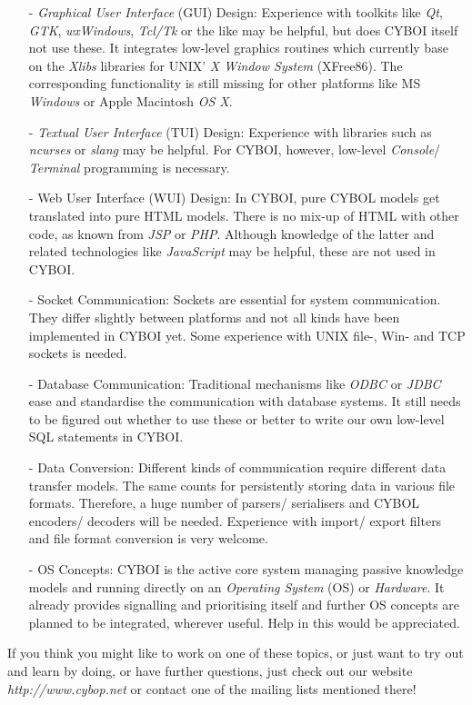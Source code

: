 \begin{itemize}
    \item[-] \emph{Graphical User Interface} (GUI) Design: Experience with
        toolkits like \emph{Qt}, \emph{GTK}, \emph{wxWindows}, \emph{Tcl/Tk} or
        the like may be helpful, but does CYBOI itself not use these. It
        integrates low-level graphics routines which currently base on the
        \emph{Xlibs} libraries for UNIX' \emph{X Window System} (XFree86). The
        corresponding functionality is still missing for other platforms like
        MS \emph{Windows} or Apple Macintosh \emph{OS X}.
    \item[-] \emph{Textual User Interface} (TUI) Design: Experience with
        libraries such as \emph{ncurses} or \emph{slang} may be helpful. For
        CYBOI, however, low-level \emph{Console}/ \emph{Terminal} programming
        is necessary.
    \item[-] Web User Interface (WUI) Design: In CYBOI, pure CYBOL models get
        translated into pure HTML models. There is no mix-up of HTML with other
        code, as known from \emph{JSP} or \emph{PHP}. Although knowledge of the
        latter and related technologies like \emph{JavaScript} may be helpful,
        these are not used in CYBOI.
    \item[-] Socket Communication: Sockets are essential for system
        communication. They differ slightly between platforms and not all kinds
        have been implemented in CYBOI yet. Some experience with UNIX file-,
        Win- and TCP sockets is needed.
    \item[-] Database Communication: Traditional mechanisms like \emph{ODBC} or
        \emph{JDBC} ease and standardise the communication with database
        systems. It still needs to be figured out whether to use these or
        better to write our own low-level SQL statements in CYBOI.
    \item[-] Data Conversion: Different kinds of communication require
        different data transfer models. The same counts for persistently
        storing data in various file formats. Therefore, a huge number of
        parsers/ serialisers and CYBOL encoders/ decoders will be needed.
        Experience with import/ export filters and file format conversion is
        very welcome.
    \item[-] OS Concepts: CYBOI is the active core system managing passive
        knowledge models and running directly on an \emph{Operating System}
        (OS) or \emph{Hardware}. It already provides signalling and
        prioritising itself and further OS concepts are planned to be
        integrated, wherever useful. Help in this would be appreciated.
\end{itemize}

If you think you might like to work on one of these topics, or just want to try
out and learn by doing, or have further questions, just check out our website
\emph{http://www.cybop.net} or contact one of the mailing lists mentioned there!
